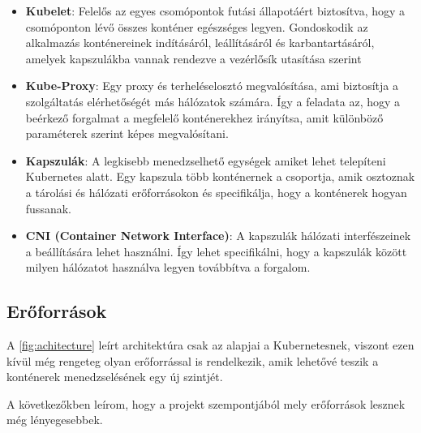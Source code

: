 \begin{itemize}
	\item \textbf{Kubelet}: Felelős az egyes csomópontok futási állapotáért biztosítva, 
	hogy a csomóponton lévő összes konténer egészséges legyen. Gondoskodik az alkalmazás
	konténereinek indításáról, leállításáról és karbantartásáról, amelyek kapszulákba 
	vannak rendezve a vezérlősík utasítása szerint
	\item \textbf{Kube-Proxy}: Egy proxy és terheléselosztó megvalósítása, ami biztosítja
	a szolgáltatás elérhetőségét más hálózatok számára. Így a feladata az, hogy a beérkező
	forgalmat a megfelelő konténerekhez irányítsa, amit különböző paraméterek szerint képes
	megvalósítani.
	\item \textbf{Kapszulák}: A legkisebb menedzselhető egységek amiket lehet telepíteni
	Kubernetes alatt. Egy kapszula több konténernek a csoportja, amik osztoznak a tárolási
	és hálózati erőforrásokon és specifikálja, hogy a konténerek hogyan fussanak. 
	\item \textbf{CNI (Container Network Interface)}: A kapszulák hálózati interfészeinek
	a beállítására lehet használni. Így lehet specifikálni, hogy a kapszulák között 
	milyen hálózatot használva legyen továbbítva a forgalom. 
\end{itemize}

\subsection{Erőforrások}

A \ref{fig:achitecture} leírt architektúra csak az alapjai a Kubernetesnek, viszont ezen kívül
még rengeteg olyan erőforrással is rendelkezik, amik lehetővé teszik a konténerek
menedzselésének egy új szintjét.

A következőkben leírom, hogy a projekt szempontjából mely erőforrások lesznek még
lényegesebbek. 

